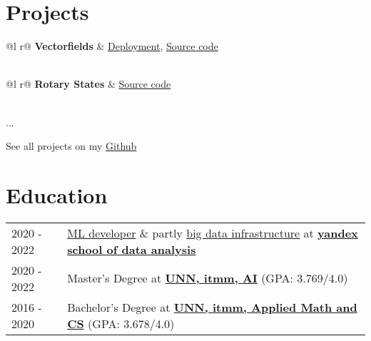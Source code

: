 \documentclass[a4paper,12pt]{article}
\begin{document}
\section{Projects}

\begin{tabularx}{\linewidth}{ @{}l r@{} }
    \textbf{Vectorfields} & \hfill \href{https://shorturl.at/zAC56}{Deployment},  \href{https://github.com/DimaAmega/vectorfields}{Source code} \\[3.75pt]
      \\
\end{tabularx}


\begin{tabularx}{\linewidth}{ @{}l r@{} }
    \textbf{Rotary States} & \hfill \href{https://github.com/unn-dynamic-systems/rotary_states}{Source code} \\[3.75pt]
     \\
\end{tabularx}

...

See all projects on my \href{https://github.com/dimaamega}{Github}

\section{Education}
\begin{tabularx}{\linewidth}{@{}l X@{}}	
2020 - 2022 & \href{https://academy.yandex.com/dataschool/course/machine-learning}{ML developer} \& partly \href{https://academy.yandex.com/dataschool/course/big-data-infrastructure}{big data infrastructure} at \textbf{\href{https://academy.yandex.com/dataschool/}{yandex school of data analysis}} \\
2020 - 2022 & Master's Degree at \textbf{\href{https://shorturl.at/dlpt5}{UNN, itmm, AI}} \hfill \normalsize (GPA: 3.769/4.0) \\
2016 - 2020 & Bachelor's Degree at \textbf{\href{https://shorturl.at/HJKYZ}{UNN, itmm, Applied Math and CS}} \hfill (GPA: 3.678/4.0) \\

\end{tabularx}
\end{document}
